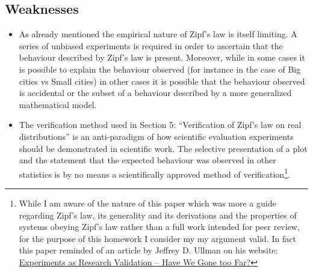 \documentclass{article} \usepackage{hyperref} \usepackage{graphicx}
\begin{document}
\subsection{Weaknesses}
\begin{itemize}
\item As already mentioned the empirical nature of Zipf's law is itself
  limiting. A series of unbiased experiments is required in order to
  ascertain that the behaviour described by Zipf's law is present. Moreover,
  while in some cases it is possible to explain the behaviour observed (for
  instance in the case of Big cities vs Small cities) in other cases it is
  possible that the behaviour observed is accidental or the subset of a
  behaviour described by a more generalized mathematical model.
\item The verification method used in Section 5: ``Verification of Zipf's
  law on real distributions'' is an anti-paradigm of how scientific
  evaluation experiments should be demonstrated in scientific work. The
  selective presentation of a plot and the statement that the expected
  behaviour was observed in other statistics is by no means a scientifically
  approved method of verification\footnote{While I am aware of the nature of
    this paper which was more a guide regarding Zipf's law, its generality
    and its derivations and the properties of systems obeying Zipf's law
    rather than a full work intended for peer review, for the purpose of
    this homework I consider my my argument valid. In fact this paper
    reminded of an article by Jeffrey D. Ullman on his website:
    \href{http://infolab.stanford.edu/~ullman/pub/experiments.pdf}{Experiments
      as Research Validation – Have We Gone too Far?}}.
\end{itemize}
\end{document}
